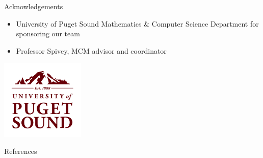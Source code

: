 \appendix

\begin{frame}{Acknowledgements}

\begin{itemize}
\item University of Puget Sound Mathematics \& Computer Science Department for sponsoring our team
\item Professor Spivey, MCM advisor and coordinator
\end{itemize}
	\vspace{-1ex}
	\begin{center}{
    \includegraphics[width= 0.3\textwidth]{img/UofPS_stacked_maroonRGB_PNG}}
    \end{center}

\end{frame}

\begin{frame}[allowframebreaks]{References}
  
  
\end{frame}